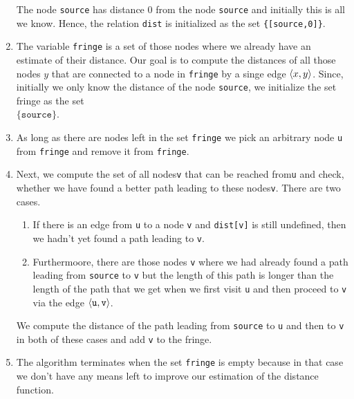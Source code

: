 \begin{enumerate}
      The node \texttt{source} has distance $0$ from the node \texttt{source} and initially this is
      all we know.  Hence, the relation \texttt{dist} is initialized as the set \texttt{\{[source,0]\}}.
\item The variable \texttt{fringe} is a set of those nodes where we already have an estimate of
      their distance.  Our goal is to compute the distances of all those nodes $y$ that are
      connected to a node in \texttt{fringe} by a singe edge $\pair(x,y)$.
      Since, initially we only know the distance of the node \texttt{source}, we initialize the set
      fringe as the set
      \\[0.2cm]
      \hspace*{1.3cm}
      $\{ \mathtt{source} \}$.
\item As long as there are nodes left in the set \texttt{fringe} we pick an arbitrary node
      \texttt{u} from \texttt{fringe} and remove it from \texttt{fringe}. 
\item Next, we compute the set of all nodes\texttt{v} that can be reached from\texttt{u} and check, whether we
      have found a better path leading to these nodes\texttt{v}.
      There are two cases.
      \begin{enumerate}
      \item If there is an edge from \texttt{u} to a node \texttt{v} and  \texttt{dist[v]} is still
            undefined, then we hadn't yet found a path leading to \texttt{v}.
      \item Furthermoore, there are those nodes \texttt{v} where we had already found a path leading from
            \texttt{source} to \texttt{v} but the length of this path is longer than the length of the path
            that we get when we first visit \texttt{u} and then proceed to \texttt{v} via the edge $\pair(\mathtt{u},\mathtt{v})$.
      \end{enumerate}
      We compute the distance of the path leading from \texttt{source} to \texttt{u} and then to
      \texttt{v} in both of these cases and add \texttt{v} to the fringe.
\item The algorithm terminates when the set \texttt{fringe} is empty because in that case we don't
      have any means left to improve our estimation of the distance function.
\end{enumerate}

